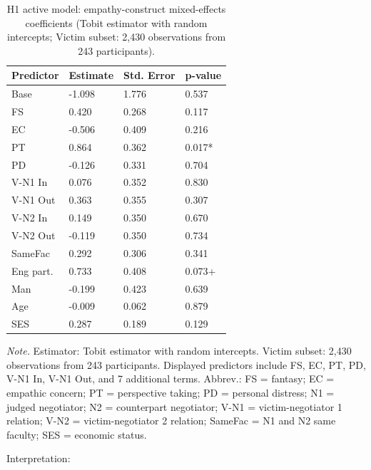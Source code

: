 \documentclass[11pt]{article}
\begin{document}
\begin{table}[H]
\centering
{\fontsize{11}{13}\selectfont
\renewcommand{\arraystretch}{1.10}
\caption{H1 active model: empathy-construct mixed-effects coefficients (Tobit estimator with random intercepts; Victim subset: 2,430 observations from 243 participants).}
\label{tab:h1_b_victim}
\begin{tabularx}{\textwidth}{>{\raggedright\arraybackslash}Xlll}
\toprule
Predictor & Estimate & Std. Error & p-value \\
\midrule
Base & -1.098 & 1.776 & 0.537 \\
FS & 0.420 & 0.268 & 0.117 \\
EC & -0.506 & 0.409 & 0.216 \\
PT & 0.864 & 0.362 & 0.017* \\
PD & -0.126 & 0.331 & 0.704 \\
V-N1 In & 0.076 & 0.352 & 0.830 \\
V-N1 Out & 0.363 & 0.355 & 0.307 \\
V-N2 In & 0.149 & 0.350 & 0.670 \\
V-N2 Out & -0.119 & 0.350 & 0.734 \\
SameFac & 0.292 & 0.306 & 0.341 \\
Eng part. & 0.733 & 0.408 & 0.073+ \\
Man & -0.199 & 0.423 & 0.639 \\
Age & -0.009 & 0.062 & 0.879 \\
SES & 0.287 & 0.189 & 0.129 \\
\bottomrule
\end{tabularx}
}
\end{table}
\begin{flushleft}
\footnotesize\textit{Note.} Estimator: Tobit estimator with random intercepts. Victim subset: 2,430 observations from 243 participants. Displayed predictors include FS, EC, PT, PD, V-N1 In, V-N1 Out, and 7 additional terms. Abbrev.: FS = fantasy; EC = empathic concern; PT = perspective taking; PD = personal distress; N1 = judged negotiator; N2 = counterpart negotiator; V-N1 = victim-negotiator 1 relation; V-N2 = victim-negotiator 2 relation; SameFac = N1 and N2 same faculty; SES = economic status.
\end{flushleft}

Interpretation:
\end{document}

